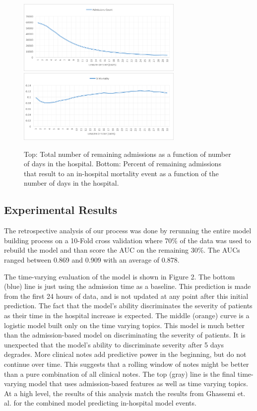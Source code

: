 \documentclass[journal]{IEEEtran}
\begin{document}
\begin{figure}[ht]
\includegraphics[width=8cm]{admission_count}
\includegraphics[width=8cm]{percent_mortality}
\caption{Top:  Total number of remaining admissions as a function of number of days in the hospital.  Bottom:  Percent of remaining admissions that result to an in-hospital mortality event as a function of the number of days in the hospital.}
\end{figure}

\subsection{Experimental Results}

The retrospective analysis of our process was done by rerunning the entire model building process on a 10-Fold cross validation where 70\% of the data was used to rebuild the model and than score the AUC on the remaining 30\%.   The AUCs ranged between 0.869 and 0.909 with an average of 0.878.

The time-varying evaluation of the model is shown in Figure 2.   The bottom (blue) line is just using the admission time as a baseline.  This prediction is made from the first 24 hours of data, and is not updated at any point after this initial prediction.  The fact that the model’s ability discriminates the severity of patients as their time in the hospital increase is expected.  The middle (orange) curve is a logistic model built only on the time varying topics.  This model is much better than the admission-based model on discriminating the severity of patients.  It is unexpected that the model’s ability to discriminate severity after 5 days degrades.   More clinical notes add predictive power in the beginning, but do not continue over time.   This suggests that a rolling window of notes might be better than a pure combination of all clinical notes.   The top (gray) line is the final time-varying model that uses admission-based features as well as time varying topics.  At a high level, the results of this analysis match the results from Ghassemi et. al. for the combined model predicting in-hospital model events.
\end{document}
